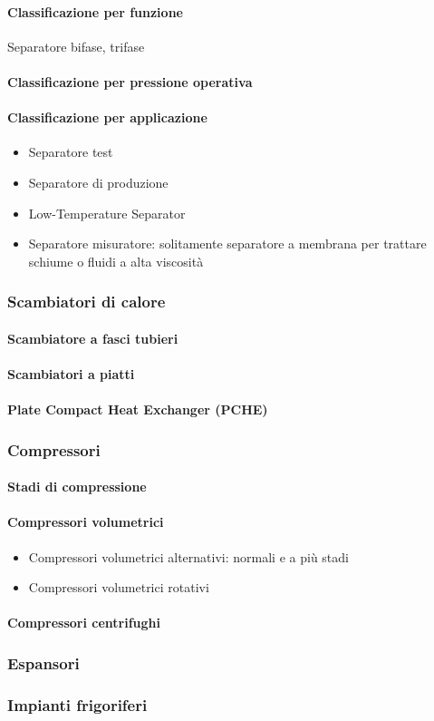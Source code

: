 \paragraph{Classificazione per funzione}
Separatore bifase, trifase
\paragraph{Classificazione per pressione operativa}
\paragraph{Classificazione per applicazione}
\begin{itemize}
\item Separatore test
\item Separatore di produzione
\item Low-Temperature Separator
\item Separatore misuratore: solitamente separatore a membrana per trattare schiume o fluidi a alta viscosità
\end{itemize}

\subsubsection{Scambiatori di calore}
\paragraph{Scambiatore a fasci tubieri}
\paragraph{Scambiatori a piatti}
\paragraph{Plate Compact Heat Exchanger (PCHE)}

\subsubsection{Compressori}
\paragraph{Stadi di compressione}
\paragraph{Compressori volumetrici}
\begin{itemize}
\item Compressori volumetrici alternativi: normali e a più stadi
\item Compressori volumetrici rotativi
\end{itemize}
\paragraph{Compressori centrifughi}

\subsubsection{Espansori}

\subsubsection{Impianti frigoriferi}



